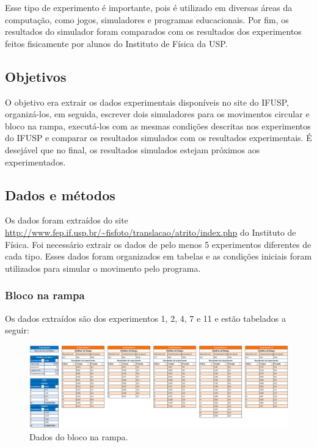 \documentclass{article}
\begin{document}
\qquad Esse tipo de experimento é importante, pois é utilizado em diversas áreas da computação, como jogos, simuladores e programas educacionais. Por fim, os resultados do simulador foram comparados com os resultados dos experimentos feitos fisicamente por alunos do Instituto de Física da USP. 

\subsection{Objetivos}

\qquad O objetivo era extrair os dados experimentais disponíveis no site do IFUSP, organizá-los, em seguida, escrever dois simuladores para os movimentos circular e bloco na rampa, executá-los com as mesmas condições descritas nos experimentos do IFUSP e comparar os resultados simulados com os resultados experimentais. É desejável que no final, os resultados simulados estejam próximos aos experimentados. 


\subsection{Dados e métodos}

\qquad Os dados foram extraídos do site \url{http://www.fep.if.usp.br/~fisfoto/translacao/atrito/index.php} do Instituto de Física. Foi necessário extrair os dados de pelo menos 5 experimentos diferentes de cada tipo. Esses dados foram organizados em tabelas e as condições iniciais foram utilizados para simular o movimento pelo programa.

\subsubsection{Bloco na rampa}

\qquad Os dados extraídos são dos experimentos 1, 2, 4, 7 e 11 e estão tabelados a seguir:

\begin{figure}[!h]
    \centering
    \includegraphics[width=16cm]{./img/tabelas_bloco_rampa.png}
    \caption{Dados do bloco na rampa.}
\end{figure}
\end{document}
